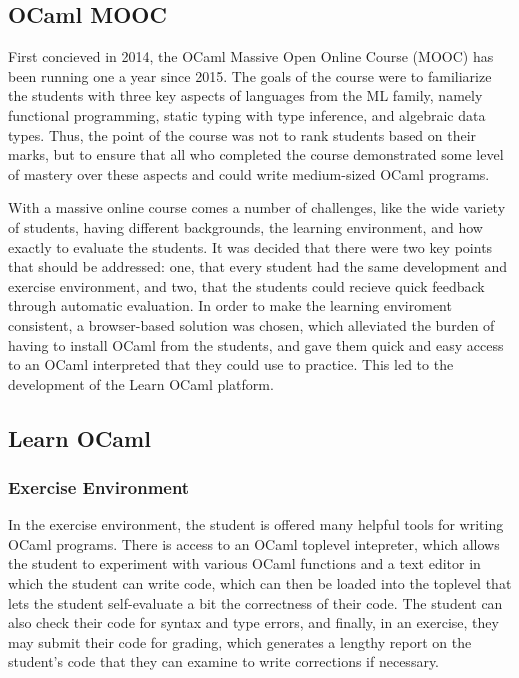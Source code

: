\documentclass[11pt]{article}
\begin{document}
\subsection{OCaml MOOC}
First concieved in 2014, the OCaml Massive Open Online Course (MOOC) has been running one a year since 2015. The goals of the course were to familiarize the students with three key aspects of languages from the ML family, namely functional programming, static typing with type inference, and algebraic data types. Thus, the point of the course was not to rank students based on their marks, but to ensure that all who completed the course demonstrated some level of mastery over these aspects and could write medium-sized OCaml programs.

With a massive online course comes a number of challenges, like the wide variety of students, having different backgrounds, the learning environment, and how exactly to evaluate the students. It was decided that there were two key points that should be addressed: one, that every student had the same development and exercise environment, and two, that the students could recieve quick feedback through automatic evaluation. In order to make the learning enviroment consistent, a browser-based solution was chosen, which alleviated the burden of having to install OCaml from the students, and gave them quick and easy access to an OCaml interpreted that they could use to practice. This led to the development of the Learn OCaml platform.

\subsection{Learn OCaml}

\subsubsection{Exercise Environment}
In the exercise environment, the student is offered many helpful tools for writing OCaml programs. There is access to an OCaml toplevel intepreter, which allows the student to experiment with various OCaml functions and a text editor in which the student can write code, which can then be loaded into the toplevel that lets the student self-evaluate a bit the correctness of their code. The student can also check their code for syntax and type errors, and finally, in an exercise, they may submit their code for grading, which generates a lengthy report on the student's code that they can examine to write corrections if necessary.
\end{document}
